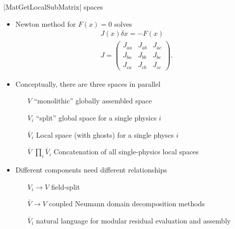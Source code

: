 \begin{frame}[fragile]{\cfunc|MatGetLocalSubMatrix| spaces}
  \begin{itemize}
  \item Newton method for $F(x) = 0$ solves
    \begin{gather*}
      J(x) \delta x = - F(x) \\
      J = \begin{pmatrix}
      J_{aa} & J_{ab} & J_{ac} \\
      J_{ba} & J_{bb} & J_{bc} \\
      J_{ca} & J_{cb} & J_{cc}
    \end{pmatrix} .
    \end{gather*}
  \item Conceptually, there are three spaces in parallel
    \begin{itemize}
    \item[$V$] ``monolithic'' globally assembled space
    \item[$V_i$] ``split'' global space for a single physics $i$
    \item[$\bar V_i$] Local space (with ghosts) for a single physcs $i$
    \item[$\bar V$] $\prod_i \bar V_i$ Concatenation of all single-physics local spaces
    \end{itemize}
  \item Different components need different relationships
    \begin{itemize}
    \item[$V_i \to V$] field-split
    \item[$\bar V \to V$] coupled Neumann domain decomposition methods
    \item[$\bar V_i$] natural language for modular residual evaluation and assembly
    \end{itemize}
  \end{itemize}
\end{frame}

